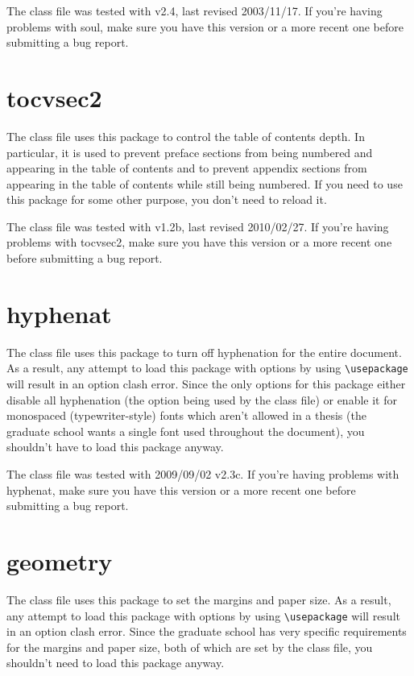 The class file was tested with v2.4, last revised 2003/11/17.  If you're having problems with soul, make sure you have this version or a more recent one before submitting a bug report.

\section{tocvsec2}
The class file uses this package to control the table of contents depth.  In particular, it is used to prevent preface sections from being numbered and appearing in the table of contents and to prevent appendix sections from appearing in the table of contents while still being numbered.  If you need to use this package for some other purpose, you don't need to reload it.

The class file was tested with v1.2b, last revised 2010/02/27.  If you're having problems with tocvsec2, make sure you have this version or a more recent one before submitting a bug report.

\section{hyphenat}
The class file uses this package to turn off hyphenation for the entire document.  As a result, any attempt to load this package with options by using \verb=\usepackage= will result in an option clash error.  Since the only options for this package either disable all hyphenation (the option being used by the class file) or enable it for monospaced (typewriter-style) fonts which aren't allowed in a thesis (the graduate school wants a single font used throughout the document), you shouldn't have to load this package anyway.

The class file was tested with 2009/09/02 v2.3c.  If you're having problems with hyphenat, make sure you have this version or a more recent one before submitting a bug report.

\section{geometry}
The class file uses this package to set the margins and paper size.  As a result, any attempt to load this package with options by using \verb=\usepackage= will result in an option clash error.  Since the graduate school has very specific requirements for the margins and paper size, both of which are set by the class file, you shouldn't need to load this package anyway.

